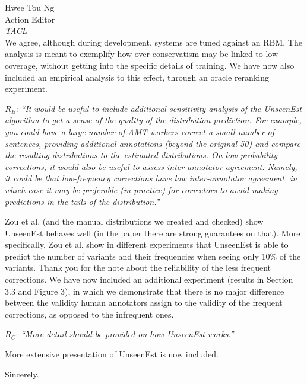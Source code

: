 \documentclass[11pt,letterpaper]{letter}
\newcommand{\oa}[1]{\footnote{\color{red}OA: #1}}
\begin{document}
\begin{letter}{%
Hwee Tou Ng\\
Action Editor\\
{\em TACL}\\
}
We agree, although during development, systems are tuned against an RBM. The analysis is meant to exemplify how over-conservatism may be linked to low coverage, without getting into the specific details of training. We have now also included an empirical analysis to this effect, through an oracle reranking experiment.
	
$R_B$: \emph{``It would be useful to include additional sensitivity analysis of the
		UnseenEst algorithm to get a sense of the quality of the distribution
		prediction. For example, you could have a large number of AMT workers
		correct a small number of sentences, providing additional annotations
		(beyond the original 50) and compare the resulting distributions to the
		estimated distributions. On low probability corrections, it would also be
		useful to assess inter-annotator agreement: Namely, it could be that
		low-frequency corrections have low inter-annotator agreement, in which case
		it may be preferable (in practice) for correctors to avoid making
		predictions in the tails of the distribution.''
		}
		
Zou et al. (and the manual distributions we created and checked) show UnseenEst behaves well (in the paper there are strong guarantees on that). More specifically, Zou et al. show in different experiments that UnseenEst is able to predict the number of variants and their frequencies when seeing only 10\% of the variants. 
Thank you for the note about the reliability of the less frequent corrections. We have now included an additional experiment (results in Section 3.3 and Figure 3), in which we demonstrate that there is no major difference between the validity human annotators assign to the validity of the frequent corrections, as opposed to the infrequent ones.
		
$R_C$: \emph{``More detail should be provided on how UnseenEst works.''}
		
More extensive presentation of UnseenEst is now included. 


\closing{Sincerely.}

\end{letter}
\end{document}
